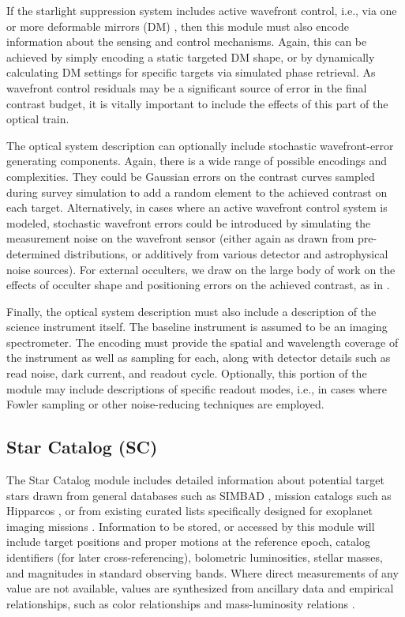 \documentclass[]{asme2ej}
\begin{document}
If the starlight suppression system includes active wavefront control, i.e., via one or more deformable mirrors (DM)  \citep{cahoy2014wavefront}, then this module must also encode information about the sensing and control mechanisms.  Again, this can be achieved by simply encoding a static targeted DM shape, or by dynamically calculating DM settings for specific targets via simulated phase retrieval.  As wavefront control residuals may be a significant source of error in the final contrast budget, it is vitally important to include the effects of this part of the optical train.

The optical system description can optionally include stochastic wavefront-error generating components.  Again, there is a wide range of possible encodings and complexities.  They could be Gaussian errors on the contrast curves sampled during survey simulation to add a random element to the achieved contrast on each target.  Alternatively, in cases where an active wavefront control system is modeled, stochastic wavefront errors could be introduced by simulating the measurement noise on the wavefront sensor (either again as drawn from pre-determined distributions, or additively from various detector and astrophysical noise sources).  For external occulters, we draw on the large body of work on the effects of occulter shape and positioning errors on the achieved contrast, as in \citet{shaklan2010error}.

Finally, the optical system description must also include a description of the science instrument itself.  The baseline instrument is assumed to be an imaging spectrometer.  The encoding must provide the spatial and wavelength coverage of the instrument as well as sampling for each, along with detector details such as read noise, dark current, and readout cycle.  Optionally, this portion of the module may include descriptions of specific readout modes, i.e., in cases where Fowler sampling \citep{fowler1990demonstration} or other noise-reducing techniques are employed.


\subsection{Star Catalog (SC)}
The Star Catalog module includes detailed information about potential target stars drawn from general databases such as SIMBAD \citep{wenger2000simbad}, mission catalogs such as Hipparcos \citep{perryman1997hipparcos}, or from existing curated lists specifically designed for exoplanet imaging missions \citep{turnbull2012search}.  Information to be stored, or accessed by this module will include  target positions and proper motions at the reference epoch, catalog identifiers (for later cross-referencing), bolometric luminosities, stellar masses, and magnitudes in standard observing bands.  Where direct measurements of any value are not available, values are synthesized from ancillary data and empirical relationships, such as color relationships and mass-luminosity relations \citep{henry2004}.
\end{document}
